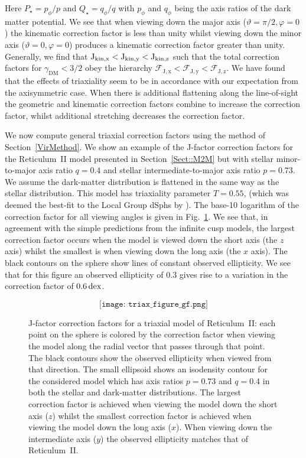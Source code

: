 \documentclass[prd,twocolumn,showpacs,preprintnumbers,superscriptaddress,nofootinbib,amsmath,amssymb,nobalancelastpage]{revtex4}
\def\dex{\,{\rm dex}}
\newcommand{\Jf}{{\rm J}}
\begin{document}
Here $P_\star=p_\phi/p$ and $Q_\star=q_\phi/q$ with $p_\phi$ and $q_\phi$ being the axis ratios of the dark matter potential. We see that when viewing down the major axis ($\vartheta=\pi/2,\varphi=0$) the kinematic correction factor is less than unity whilst viewing down the minor axis ($\vartheta=0,\varphi=0$) produces a kinematic correction factor greater than unity. Generally, we find that $\Jf_{\rm kin,x}<\Jf_{\rm kin,y}<\Jf_{\rm kin,z}$ such that the total correction factors for $\gamma_\mathrm{DM}<3/2$ obey the hierarchy $\mathcal{F}_\mathrm{J,x}<\mathcal{F}_\mathrm{J,y}<\mathcal{F}_\mathrm{J,z}$. We have found that the effects of triaxiality seem to be in accordance with our expectation from the axisymmetric case. When there is additional flattening along the line-of-sight the geometric and kinematic correction factors combine to increase the correction factor, whilst additional stretching decreases the correction factor.

We now compute general triaxial correction factors using the method of Section~\ref{VirMethod}. We show an example of the J-factor correction factors for the Reticulum~II model presented in Section~\ref{Sect::M2M} but with stellar minor-to-major axis ratio $q=0.4$ and stellar intermediate-to-major axis ratio $p=0.73$. We assume the dark-matter distribution is flattened in the same way as the stellar distribution. This model has triaxiality parameter $T=0.55$, (which was deemed the best-fit to the Local Group dSphs by \cite{SanchezJanssen2016}). The base-10 logarithm of the correction factor for all viewing angles is given in Fig.~\ref{Triax}. We see that, in agreement with the simple predictions from the infinite cusp models, the largest correction factor occurs when the model is viewed down the short axis (the $z$ axis) whilst the smallest is when viewing down the long axis (the $x$ axis). The black contours on the sphere show lines of constant observed ellipticity. We see that for this figure an observed ellipticity of $0.3$ gives rise to a variation in the correction factor of $0.6\dex$.

\begin{figure}
$$\texttt{[image: triax\_figure\_gf.png]}$$
\caption{J-factor correction factors for a triaxial model of Reticulum~II: each point on the sphere is colored by the correction factor when viewing the model along the radial vector that passes through that point. The black contours show the observed ellipticity when viewed from that direction. The small ellipsoid shows an isodensity contour for the considered model which has axis ratios $p=0.73$ and $q=0.4$ in both the stellar and dark-matter distributions. The largest correction factor is achieved when viewing the model down the short axis ($z$) whilst the smallest correction factor is achieved when viewing the model down the long axis ($x$). When viewing down the intermediate axis ($y$) the observed ellipticity matches that of Reticulum~II.}
\label{Triax}
\end{figure}
\end{document}
